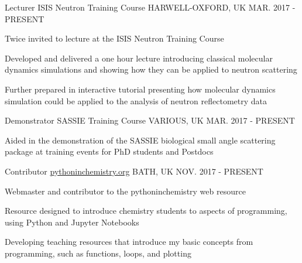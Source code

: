 \begin{cventries}
{\begin{cvitems}
		\end{cvitems}
	}
	\cventry
	{Lecturer}
	{ISIS Neutron Training Course}
	{HARWELL-OXFORD, UK}
	{MAR. 2017 - PRESENT}
	{
		\begin{cvitems}
			\item {Twice invited to lecture at the ISIS Neutron Training Course}
			\item {Developed and delivered a one hour lecture introducing classical molecular dynamics simulations and showing how they can be applied to neutron scattering}
			\item {Further prepared in interactive tutorial presenting how molecular dynamics simulation could be applied to the analysis of neutron reflectometry data}
		\end{cvitems}
	}
	\cventry
	{Demonstrator}
	{SASSIE Training Course}
	{VARIOUS, UK}
	{MAR. 2017 - PRESENT}
	{
		\begin{cvitems}
			\item {Aided in the demonstration of the SASSIE biological small angle scattering package at training events for PhD students and Postdocs}
		\end{cvitems}
	}
	\cventry
	{Contributor}
	{\href{http://pythoninchemistry.org}{pythoninchemistry.org}}
	{BATH, UK}
	{NOV. 2017 - PRESENT}
	{
		\begin{cvitems}
			\item {Webmaster and contributor to the pythoninchemistry web resource}
			\item {Resource designed to introduce chemistry students to aspects of programming, using Python and Jupyter Notebooks}
			\item {Developing teaching resources that introduce my basic concepts from programming, such as functions, loops, and plotting}
		\end{cvitems}
	}
\end{cventries}
